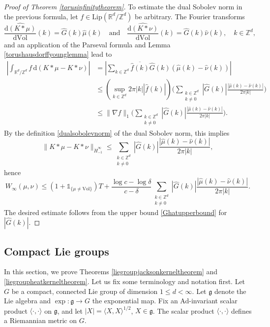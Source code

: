 \documentclass[11pt,a4paper]{article}
\theoremstyle{definition}
\begin{document}
\begin{proof}[Proof of Theorem \ref{torusinfinitytheorem}]
To estimate the dual Sobolev norm in the previous formula, let $f \in \mathrm{Lip}(\mathbb{R}^d / \mathbb{Z}^d)$ be arbitrary. The Fourier transforms
\[ \widehat{\frac{\mathrm{d}(K*\mu)}{\mathrm{d}\mathrm{Vol}}}(k) = \widehat{G}(k) \widehat{\mu}(k) \quad \textrm{and} \quad \widehat{\frac{\mathrm{d}(K*\nu)}{\mathrm{d}\mathrm{Vol}}}(k) = \widehat{G}(k) \widehat{\nu}(k), \quad k \in \mathbb{Z}^d, \]
and an application of the Parseval formula and Lemma \ref{torushausdorffyounglemma} lead to
\[ \begin{split} \left| \int_{\mathbb{R}^d / \mathbb{Z}^d} f \, \mathrm{d} (K*\mu - K*\nu) \right| &= \left| \sum_{k \in \mathbb{Z}^d} \overline{\widehat{f}(k)} \widehat{G}(k) (\widehat{\mu}(k) - \widehat{\nu}(k)) \right| \\ &\le \left( \sup_{k \in \mathbb{Z}^d} 2 \pi |k| |\widehat{f}(k)| \right) \Bigg( \sum_{\substack{k \in \mathbb{Z}^d \\ k \neq 0}} |\widehat{G}(k)| \frac{|\widehat{\mu}(k) - \widehat{\nu}(k)|}{2 \pi |k|} \Bigg) \\ &\le \| \nabla f \|_1 \Bigg( \sum_{\substack{k \in \mathbb{Z}^d \\ k \neq 0}} |\widehat{G}(k)| \frac{|\widehat{\mu}(k) - \widehat{\nu}(k)|}{2 \pi |k|} \Bigg). \end{split} \]
By the definition \eqref{dualsobolevnorm} of the dual Sobolev norm, this implies
\[ \| K*\mu - K*\nu \|_{\dot{H}_{-1}^{\infty}} \le \sum_{\substack{k \in \mathbb{Z}^d \\ k \neq 0}} |\widehat{G}(k)| \frac{|\widehat{\mu}(k) - \widehat{\nu}(k)|}{2 \pi |k|}, \]
hence
\[ W_{\infty} (\mu, \nu) \le \left( 1+\mathds{1}_{\{ \mu \neq \mathrm{Vol} \}} \right) T + \frac{\log c - \log \delta}{c-\delta} \sum_{\substack{k \in \mathbb{Z}^d \\ k \neq 0}} |\widehat{G}(k)| \frac{|\widehat{\mu}(k) - \widehat{\nu}(k)|}{2 \pi |k|} . \]
The desired estimate follows from the upper bound \eqref{Ghatupperbound} for $|\widehat{G}(k)|$.
\end{proof}

\subsection{Compact Lie groups}\label{liegroupproofsection}

In this section, we prove Theorems \ref{liegroupjacksonkerneltheorem} and \ref{liegroupheatkerneltheorem}. Let us fix some terminology and notation first. Let $G$ be a compact, connected Lie group of dimension $1 \le d < \infty$. Let $\mathfrak{g}$ denote the Lie algebra and $\exp: \mathfrak{g} \to G$ the exponential map. Fix an Ad-invariant scalar product $\langle \cdot, \cdot \rangle$ on $\mathfrak{g}$, and let $|X| = \langle X,X \rangle^{1/2}$, $X \in \mathfrak{g}$. The scalar product $\langle \cdot, \cdot \rangle$ defines a Riemannian metric on $G$.
\end{document}
